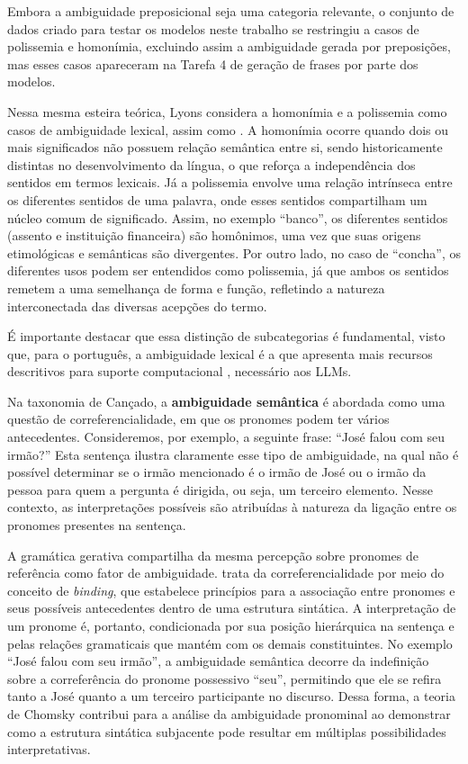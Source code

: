 Embora a ambiguidade preposicional seja uma categoria relevante, o conjunto de dados criado para testar os modelos neste trabalho se restringiu a casos de polissemia e homonímia, excluindo assim a ambiguidade gerada por preposições, mas esses casos apareceram na Tarefa 4 de geração de frases por parte dos modelos.

Nessa mesma esteira teórica, Lyons \cite{lyons1977semantics} considera a homonímia e a polissemia como casos de ambiguidade lexical, assim como \cite{canccado2005manual}. A homonímia ocorre quando dois ou mais significados não possuem relação semântica entre si, sendo historicamente distintas no desenvolvimento da língua, o que reforça a independência dos sentidos em termos lexicais. Já a polissemia envolve uma relação intrínseca entre os diferentes sentidos de uma palavra, onde esses sentidos compartilham um núcleo comum de significado. Assim, no exemplo \enquote{banco},  os diferentes sentidos (assento e instituição financeira) são homônimos, uma vez que suas origens etimológicas e semânticas são divergentes. Por outro lado, no caso de \enquote{concha}, os diferentes usos podem ser entendidos como polissemia, já que ambos os sentidos remetem a uma semelhança de forma e função, refletindo a natureza interconectada das diversas acepções do termo.

É importante destacar que essa distinção de subcategorias é fundamental, visto que, para o português, a ambiguidade lexical é a que apresenta mais recursos descritivos para suporte computacional \cite{laporte2001resoluccao}, necessário aos LLMs.

 
Na taxonomia de Cançado, a \textbf{ambiguidade semântica} é abordada como uma questão de correferencialidade, em que os pronomes podem ter vários antecedentes. Consideremos, por exemplo, a seguinte frase: ``José falou com seu irmão?'' Esta sentença ilustra claramente esse tipo de ambiguidade, na qual não é possível determinar se o irmão mencionado é o irmão de José ou o irmão da pessoa para quem a pergunta é dirigida, ou seja, um terceiro elemento. Nesse contexto, as interpretações possíveis são atribuídas à natureza da ligação entre os pronomes presentes na sentença.

A gramática gerativa compartilha da mesma percepção sobre pronomes de referência como fator de ambiguidade. \cite{chomsky1981lectures} trata da correferencialidade por meio do conceito de \textit{binding}, que estabelece princípios para a associação entre pronomes e seus possíveis antecedentes dentro de uma estrutura sintática. A interpretação de um pronome é, portanto, condicionada por sua posição hierárquica na sentença e pelas relações gramaticais que mantém com os demais constituintes. No exemplo \enquote{José falou com seu irmão}, a ambiguidade semântica decorre da indefinição sobre a correferência do pronome possessivo \enquote{seu}, permitindo que ele se refira tanto a José quanto a um terceiro participante no discurso. Dessa forma, a teoria de Chomsky contribui para a análise da ambiguidade pronominal ao demonstrar como a estrutura sintática subjacente pode resultar em múltiplas possibilidades interpretativas.

